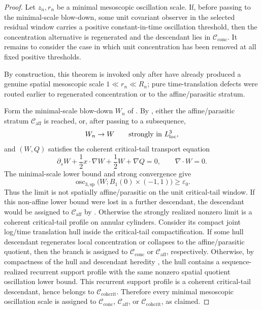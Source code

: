 \documentclass[11pt]{amsart}
\numberwithin{equation}{section}
\theoremstyle{plain}
\theoremstyle{definition}
\theoremstyle{remark}
\newcommand{\loc}{\mathrm{loc}}
\newcommand{\Cactive}{\mathcal C_{\mathrm{conc}}}
\newcommand{\Caff}{\mathcal C_{\mathrm{aff}}}
\newcommand{\Ccohcrit}{\mathcal C_{\mathrm{cohcrit}}}
\newcommand{\oscsp}{\operatorname{osc}_{3,\mathrm{sp}}}
\begin{document}
\begin{proof}
Let \(z_n,r_n\) be a minimal mesoscopic oscillation scale.  If, before passing to the
minimal-scale blow-down, some unit covariant observer in the selected residual
window carries a positive constant-in-time oscillation threshold, then the
concentration alternative is regenerated and the descendant lies in \(\Cactive\).  It remains to
consider the case in which unit concentration has been removed at all fixed positive
thresholds.

By construction, this theorem is invoked only after
have already produced a genuine spatial mesoscopic scale
\(1\ll r_n\ll R_n\); pure time-translation defects were routed earlier to
regenerated concentration or to the affine/parasitic stratum.

Form the minimal-scale blow-down \(W_n\) of
.  By
, either the affine/parasitic stratum
\(\Caff\) is reached, or, after passing to a subsequence,
\[
   W_n\to W
   \qquad\hbox{strongly in }L^3_{\loc},
\]
and \((W,Q)\) satisfies the coherent critical-tail transport equation
\[
   \partial_sW+\frac12x\cdot\nabla W+\frac12W+\nabla Q=0,
   \qquad \nabla\cdot W=0 .
\]
The minimal-scale lower bound and strong convergence give
\[
   \oscsp\bigl(W;B_1(0)\times(-1,1)\bigr)
   \ge \varepsilon_0 .
\]
Thus the limit is not spatially affine/parasitic on the unit critical-tail
window.  If this non-affine lower bound were lost in a further descendant, the
descendant would be assigned to \(\Caff\) by
.  Otherwise the strongly realized
nonzero limit is a coherent critical-tail profile on annular cylinders.
Consider its compact joint log/time translation hull inside the critical-tail
compactification.  If some hull descendant regenerates local concentration or
collapses to the affine/parasitic quotient, then the branch is assigned to
\(\Cactive\) or \(\Caff\), respectively.  Otherwise, by compactness of the hull
and descendant heredity
, the hull
contains a sequence-realized recurrent support profile with the same nonzero
spatial quotient oscillation lower bound.  This recurrent support profile is a
coherent critical-tail descendant, hence belongs to \(\Ccohcrit\).  Therefore every minimal mesoscopic oscillation scale is assigned to
\(\Cactive\), \(\Caff\), or \(\Ccohcrit\), as claimed.
\end{proof}
\end{document}
